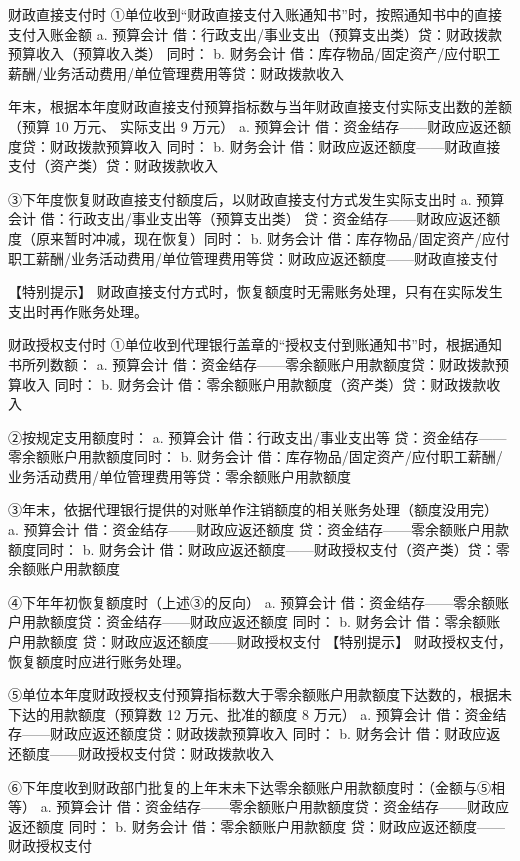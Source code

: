 \documentclass[UTF8,12pt]{ctexart}
\numberwithin{equation}{section} %
\numberwithin{figure}{section}
\numberwithin{table}{section}
\begin{document}
	财政直接支付时
	①单位收到“财政直接支付入账通知书”时，按照通知书中的直接支付入账金额
	a.	预算会计
	借：行政支出/事业支出（预算支出类）贷：财政拨款预算收入（预算收入类）
	同时：
	b.	财务会计
	借：库存物品/固定资产/应付职工薪酬/业务活动费用/单位管理费用等贷：财政拨款收入
	
	年末，根据本年度财政直接支付预算指标数与当年财政直接支付实际支出数的差额（预算 10 万元、
	实际支出 9 万元）
	a.	预算会计
	借：资金结存——财政应返还额度贷：财政拨款预算收入
	同时：
	b.	财务会计
	借：财政应返还额度——财政直接支付（资产类）贷：财政拨款收入
	
	③下年度恢复财政直接支付额度后，以财政直接支付方式发生实际支出时
	a.	预算会计
	借：行政支出/事业支出等（预算支出类）
	贷：资金结存——财政应返还额度（原来暂时冲减，现在恢复）同时：
	b.	财务会计
	借：库存物品/固定资产/应付职工薪酬/业务活动费用/单位管理费用等贷：财政应返还额度——财政直接支付
	
	【特别提示】
	财政直接支付方式时，恢复额度时无需账务处理，只有在实际发生支出时再作账务处理。
	
	财政授权支付时
	①单位收到代理银行盖章的“授权支付到账通知书”时，根据通知书所列数额：
	a.	预算会计
	借：资金结存——零余额账户用款额度贷：财政拨款预算收入
	同时：
	b.	财务会计
	借：零余额账户用款额度（资产类）贷：财政拨款收入
	
	②按规定支用额度时：
	a.	预算会计
	借：行政支出/事业支出等
	贷：资金结存——零余额账户用款额度同时：
	b.	财务会计
	借：库存物品/固定资产/应付职工薪酬/业务活动费用/单位管理费用等贷：零余额账户用款额度
	
	③年末，依据代理银行提供的对账单作注销额度的相关账务处理（额度没用完）
	a.	预算会计
	借：资金结存——财政应返还额度
	贷：资金结存——零余额账户用款额度同时：
	b.	财务会计
	借：财政应返还额度——财政授权支付（资产类）贷：零余额账户用款额度
	
	④下年年初恢复额度时（上述③的反向）
	a.	预算会计
	借：资金结存——零余额账户用款额度贷：资金结存——财政应返还额度
	同时：
	b.	财务会计
	借：零余额账户用款额度
	贷：财政应返还额度——财政授权支付
	【特别提示】
	财政授权支付，恢复额度时应进行账务处理。
	
	⑤单位本年度财政授权支付预算指标数大于零余额账户用款额度下达数的，根据未下达的用款额度（预算数 12 万元、批准的额度 8 万元）
	a.	预算会计
	借：资金结存——财政应返还额度贷：财政拨款预算收入
	同时：
	b.	财务会计
	借：财政应返还额度——财政授权支付贷：财政拨款收入
	
	⑥下年度收到财政部门批复的上年末未下达零余额账户用款额度时：（金额与⑤相等）
	a.	预算会计
	借：资金结存——零余额账户用款额度贷：资金结存——财政应返还额度
	同时：
	b.	财务会计
	借：零余额账户用款额度
	贷：财政应返还额度——财政授权支付
	
\end{document}
